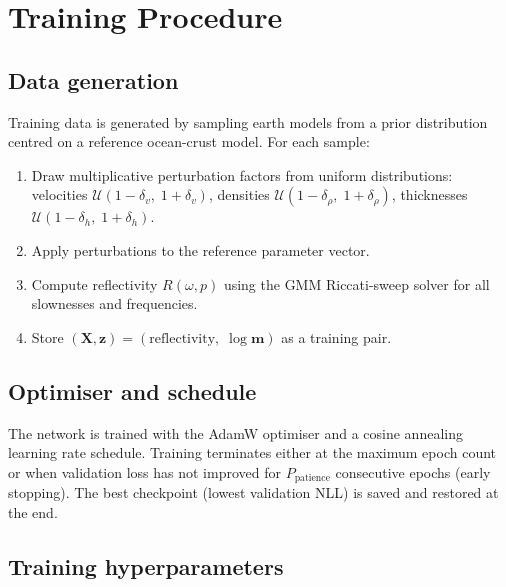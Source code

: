 \documentclass[11pt,a4paper]{article}
\theoremstyle{plain}
\theoremstyle{remark}
\begin{document}
\section{Training Procedure}\label{sec:training}

\subsection{Data generation}

Training data is generated by sampling earth models from a prior
distribution centred on a reference ocean-crust model.  For each
sample:
\begin{enumerate}[nosep]
  \item Draw multiplicative perturbation factors from uniform
    distributions: velocities $\mathcal{U}(1{-}\delta_v,\; 1{+}\delta_v)$,
    densities $\mathcal{U}(1{-}\delta_\rho,\; 1{+}\delta_\rho)$,
    thicknesses $\mathcal{U}(1{-}\delta_h,\; 1{+}\delta_h)$.
  \item Apply perturbations to the reference parameter vector.
  \item Compute reflectivity $R(\omega, p)$ using the GMM
    Riccati-sweep solver for all slownesses and frequencies.
  \item Store $(\mathbf{X}, \mathbf{z}) = (\text{reflectivity},\;
    \log\mathbf{m})$ as a training pair.
\end{enumerate}

\subsection{Optimiser and schedule}

The network is trained with the AdamW optimiser and a cosine annealing
learning rate schedule.  Training terminates either at the maximum
epoch count or when validation loss has not improved for
$P_{\text{patience}}$ consecutive epochs (early stopping).  The best
checkpoint (lowest validation NLL) is saved and restored at the end.

\subsection{Training hyperparameters}
\end{document}
